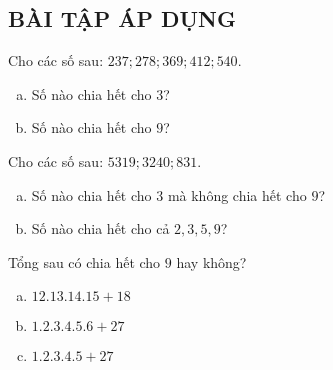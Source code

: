 \subsection{BÀI TẬP ÁP DỤNG}
\begin{bt} Cho các số sau: $237; 278; 369; 412; 540$.
\begin{enumerate}[a)]
\item Số nào chia hết cho $3$?
\item Số nào chia hết cho $9$?
\end{enumerate}
\end{bt}   \begin{bt} Cho các số sau: $5319; 3240; 831$.
\begin{enumerate}[a)]
\item Số nào chia hết cho $3$ mà không chia hết cho $9$?
\item Số nào chia hết cho cả $2, 3, 5, 9$?
\end{enumerate}
\end{bt}   \begin{bt}
Tổng sau có chia hết cho $9$ hay không?
\begin{enumerate}[a)]
\item $12 . 13 . 14 . 15 + 18$
\item $1 . 2 . 3 . 4 . 5 . 6 + 27$
\item $1 . 2 . 3 . 4 . 5 + 27$
\end{enumerate}

\end{bt}
